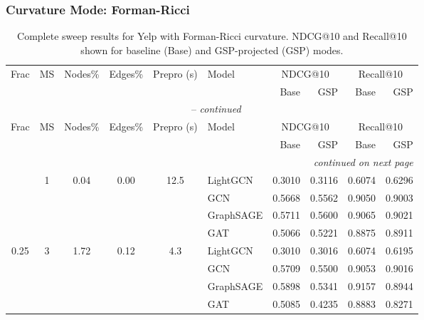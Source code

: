 \subsubsection*{Curvature Mode: Forman-Ricci}
{\footnotesize
\setlength{\tabcolsep}{4pt}
\begin{longtable}{cccccl rrrr}
\caption{Complete sweep results for Yelp with Forman-Ricci curvature. NDCG@10 and Recall@10 shown for baseline (Base) and GSP-projected (GSP) modes.} \label{tab:yelp_forman_ricci_sweep} \\
\toprule
\multirow{2}{*}{Frac} & \multirow{2}{*}{MS} & \multirow{2}{*}{Nodes\%} & \multirow{2}{*}{Edges\%} & \multirow{2}{*}{Prepro (s)} & \multirow{2}{*}{Model} & \multicolumn{2}{c}{NDCG@10} & \multicolumn{2}{c}{Recall@10} \\
\cmidrule(lr){7-8}\cmidrule(lr){9-10}
 & & & & & & Base & GSP & Base & GSP \\
\midrule
\endfirsthead
\multicolumn{10}{c}{\tablename~\thetable{} -- \textit{continued}} \\
\toprule
\multirow{2}{*}{Frac} & \multirow{2}{*}{MS} & \multirow{2}{*}{Nodes\%} & \multirow{2}{*}{Edges\%} & \multirow{2}{*}{Prepro (s)} & \multirow{2}{*}{Model} & \multicolumn{2}{c}{NDCG@10} & \multicolumn{2}{c}{Recall@10} \\
\cmidrule(lr){7-8}\cmidrule(lr){9-10}
 & & & & & & Base & GSP & Base & GSP \\
\midrule
\endhead
\midrule \multicolumn{10}{r}{\textit{continued on next page}} \\
\endfoot
\bottomrule
\endlastfoot
\multirow{4}{*}{0.25} & \multirow{4}{*}{1} & \multirow{4}{*}{0.04} & \multirow{4}{*}{0.00} & \multirow{4}{*}{12.5} & LightGCN & 0.3010 & 0.3116 & 0.6074 & 0.6296 \\
 & & & & & GCN & 0.5668 & 0.5562 & 0.9050 & 0.9003 \\
 & & & & & GraphSAGE & 0.5711 & 0.5600 & 0.9065 & 0.9021 \\
 & & & & & GAT & 0.5066 & 0.5221 & 0.8875 & 0.8911 \\
\midrule
\multirow{4}{*}{0.25} & \multirow{4}{*}{3} & \multirow{4}{*}{1.72} & \multirow{4}{*}{0.12} & \multirow{4}{*}{4.3} & LightGCN & 0.3010 & 0.3016 & 0.6074 & 0.6195 \\
 & & & & & GCN & 0.5709 & 0.5500 & 0.9053 & 0.9016 \\
 & & & & & GraphSAGE & 0.5898 & 0.5341 & 0.9157 & 0.8944 \\
 & & & & & GAT & 0.5085 & 0.4235 & 0.8883 & 0.8271 \\

\end{longtable}}
